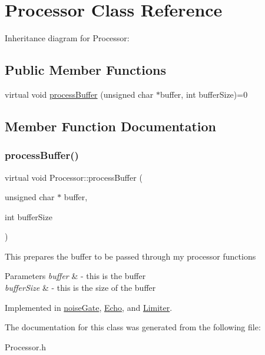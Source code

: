 \hypertarget{classProcessor}{}\section{Processor Class Reference}
\label{classProcessor}


Inheritance diagram for Processor\+:
\subsection*{Public Member Functions}
\begin{DoxyCompactItemize}
\item 
virtual void \hyperlink{classProcessor_a401e57b59e43de9c4a51ca0f566d2948}{process\+Buffer} (unsigned char $\ast$buffer, int buffer\+Size)=0
\end{DoxyCompactItemize}


\subsection{Member Function Documentation}
\mbox{\label{classProcessor_a401e57b59e43de9c4a51ca0f566d2948}} 
\subsubsection{\texorpdfstring{process\+Buffer()}{processBuffer()}}
{\footnotesize\ttfamily virtual void Processor\+::process\+Buffer (\begin{DoxyParamCaption}\item[{unsigned char $\ast$}]{buffer,  }\item[{int}]{buffer\+Size }\end{DoxyParamCaption})\hspace{0.3cm}{\ttfamily [pure virtual]}}

This prepares the buffer to be passed through my processor functions 
\begin{DoxyParams}{Parameters}
{\em buffer} & -\/ this is the buffer \\
\hline
{\em buffer\+Size} & -\/ this is the size of the buffer \\
\hline
\end{DoxyParams}


Implemented in \hyperlink{classnoiseGate_a80aba98941fd95442fa3961b370fad35}{noise\+Gate}, \hyperlink{classEcho_af018d3d63e8c58e2d5d9b719558e6c0c}{Echo}, and \hyperlink{classLimiter_a226a4a5c3890a5dfbe35220595c3df2b}{Limiter}.



The documentation for this class was generated from the following file\+:\begin{DoxyCompactItemize}
\item 
Processor.\+h\end{DoxyCompactItemize}
